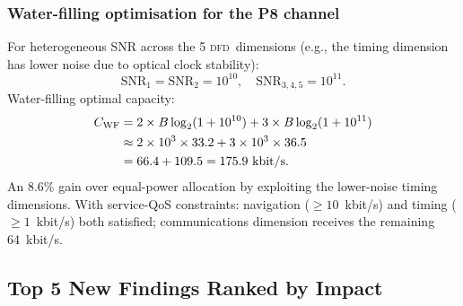 \documentclass[aps,prd,twocolumn,superscriptaddress,nofootinbib,longbibliography]{revtex4-2}
\newcommand{\DFD}{\textsc{dfd}}
\begin{document}
\subsubsection{Water-filling optimisation for the P8 channel}
\label{sec:waterfill}

For heterogeneous SNR across the 5 \DFD\ dimensions (e.g., the
timing dimension has lower noise due to optical clock stability):
\begin{equation}
\text{SNR}_1 = \text{SNR}_2 = 10^{10},\quad
\text{SNR}_{3,4,5} = 10^{11}.
\end{equation}
Water-filling optimal capacity:
\begin{align}
C_{\rm WF} &= 2\times B\log_2(1+10^{10}) + 3\times B\log_2(1+10^{11}) \nonumber\\
&\approx 2\times10^3\times33.2 + 3\times10^3\times36.5 \nonumber\\
&= 66.4 + 109.5 = 175.9\ \si{kbit/s}.
\end{align}
An $8.6\%$ gain over equal-power allocation by exploiting the
lower-noise timing dimensions.  With service-QoS constraints:
navigation ($\geq 10$~kbit/s) and timing ($\geq 1$~kbit/s) both
satisfied; communications dimension receives the remaining 64~kbit/s.

\subsection{Top 5 New Findings Ranked by Impact}
\label{sec:top5}
\end{document}
